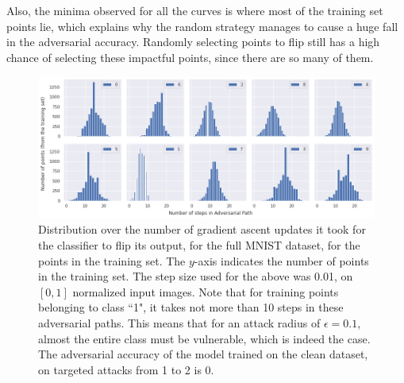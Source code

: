 \documentclass{ociamthesis}
\begin{document}
    Also, the minima observed for all the curves is where most of the training
    set points lie, which explains why the random strategy manages to cause a
    huge fall in the adversarial accuracy. Randomly selecting points to flip
    still has a high chance of selecting these impactful points, since there are
    so many of them.

    \begin{figure}[!h]
        \centering
        \includegraphics[scale=0.425]{full-MNIST-pgd-scores.png}
        \caption{Distribution over the number of gradient ascent updates it took
        for the classifier to flip its output, for the full MNIST dataset, for
        the points in the training set. The $y$-axis indicates the number of
        points in the training set. The step size used for the above was 0.01,
        on $[0, 1]$ normalized input images. Note that for training points
        belonging to class ``1", it takes not more than 10 steps in these
        adversarial paths. This means that for an attack radius of
        $\epsilon=0.1$, almost the entire class must be vulnerable, which is
        indeed the case. The adversarial accuracy of the model trained on the
        clean dataset, on targeted attacks from 1 to 2 is 0.}
        \label{fig:full-mnist-pgd-path}
    \end{figure}

\end{document}
